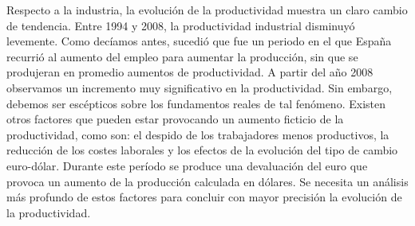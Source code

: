     Respecto a la industria, la evolución de la productividad muestra un claro cambio de tendencia. Entre 1994 y 2008, la productividad industrial disminuyó levemente. Como decíamos antes, sucedió que fue un periodo en el que España recurrió al aumento del empleo para aumentar la producción, sin que se produjeran en promedio aumentos de productividad. A partir del año 2008 observamos un incremento muy significativo en la productividad. Sin embargo, debemos ser escépticos sobre los fundamentos reales de tal fenómeno. Existen otros factores que pueden estar provocando un aumento ficticio de la productividad, como son: el despido de los trabajadores menos productivos, la reducción de los costes laborales y los efectos de la evolución del tipo de cambio euro-dólar. Durante este período se produce una devaluación del euro que provoca un aumento de la producción calculada en dólares. Se necesita un análisis más profundo de estos factores para concluir con mayor precisión la evolución de la productividad.\\

